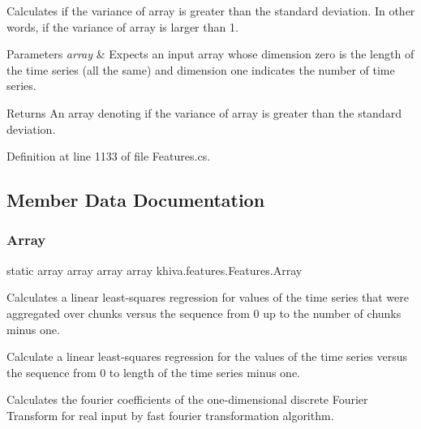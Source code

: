 Calculates if the variance of array is greater than the standard deviation. In other words, if the variance of array is larger than 1. 


\begin{DoxyParams}{Parameters}
{\em array} & Expects an input array whose dimension zero is the length of the time series (all the same) and dimension one indicates the number of time series.\\
\hline
\end{DoxyParams}
\begin{DoxyReturn}{Returns}
An array denoting if the variance of array is greater than the standard deviation.
\end{DoxyReturn}


Definition at line 1133 of file Features.\+cs.



\subsection{Member Data Documentation}
\mbox{\label{classkhiva_1_1features_1_1_features_a055f8745244a303a358d35407c8200c5}} 
\subsubsection{\texorpdfstring{Array}{Array}}
{\footnotesize\ttfamily static array array array array khiva.\+features.\+Features.\+Array\hspace{0.3cm}{\ttfamily [static]}}



Calculates a linear least-\/squares regression for values of the time series that were aggregated over chunks versus the sequence from 0 up to the number of chunks minus one. 

Calculate a linear least-\/squares regression for the values of the time series versus the sequence from 0 to length of the time series minus one. 

Calculates the fourier coefficients of the one-\/dimensional discrete Fourier Transform for real input by fast fourier transformation algorithm. 


